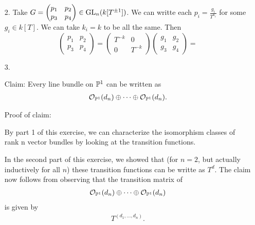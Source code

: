 \begin{exercise}{2}
\begin{enumerate}
    \item[2.]{
            Take $G = \begin{pmatrix} p_1 & p_2 \\ p_3 & p_4 \end{pmatrix} \in
                \operatorname{GL}_n(k[T^{\pm 1}])$. We can writte each $p_i =
                \frac{g_i}{T^{k_i}}$ for some $g_i \in k[T]$. We can take $k_i =
                k$ to be all the same. Then
                \begin{equation}
                    \begin{pmatrix} p_1 & p_2 \\ p_3 & p_4 \end{pmatrix} =
                        \begin{pmatrix} T^{-k} & 0 \\ 0 & T^{-k} \end{pmatrix} 
                    \begin{pmatrix} g_1 & g_2 \\ g_3 & g_4 \end{pmatrix} = 
                \end{equation}
        }
    \item[3.]{
        Claim: Every line bundle on $\mathbb{P}^1$ can be written as 
        \begin{align*}
            \mathcal{O}_{\mathbb{P}^1}(d_n)\oplus \dots \oplus \mathcal{O}_{\mathbb{P} ^1}(d_n).
        \end{align*}
        
        Proof of claim:

        By part 1 of this exercise, we can characterize the isomorphism classes of rank n vector bundles by looking at the transition functions. 

        In the second part of this exercise, we showed that (for $n=2$, but actually inductively for all $n$) these 
        transition functions can be writte as $T^d$. The claim now follows from observing that the transition matrix of 
        \begin{align*}
            \mathcal{O}_{\mathbb{P}^1}(d_n)\oplus \dots \oplus \mathcal{O}_{\mathbb{P} ^1}(d_n)
        \end{align*}
        is given by
        \begin{align*}
            T^{(d_1,\dots, d_n)}.
        \end{align*}
    }
    \end{enumerate}
\end{exercise}


